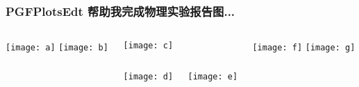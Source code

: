 \begin{frame}
  \frametitle{PGFPlotsEdt 帮助我完成物理实验报告图...}
  \begin{columns}
    \begin{column}{0.25\textwidth}
      \texttt{[image: a]}
      \texttt{[image: b]}
    \end{column}
    \begin{column}{0.50\textwidth}
      \texttt{[image: c]}
      \begin{columns}
        \begin{column}{0.5\linewidth}
          \texttt{[image: d]}
        \end{column}
        \begin{column}{0.5\linewidth}
          \texttt{[image: e]}
        \end{column}
      \end{columns}
    \end{column}
    \begin{column}{0.25\textwidth}
      \texttt{[image: f]}
      \texttt{[image: g]}
    \end{column}
  \end{columns}
\end{frame}